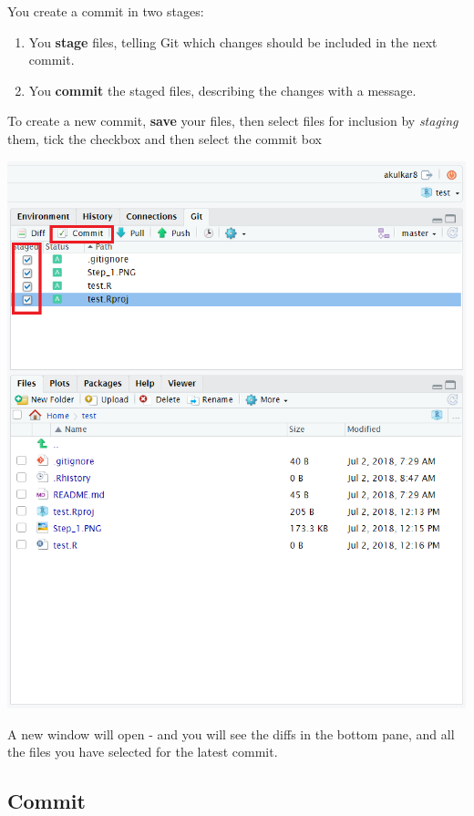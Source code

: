\documentclass[
]{book}
\begin{document}
You create a commit in two stages:

\begin{enumerate}
\def\labelenumi{\arabic{enumi}.}
\item
  You \textbf{stage} files, telling Git which changes should be included in the next commit.
\item
  You \textbf{commit} the staged files, describing the changes with a message.
\end{enumerate}

To create a new commit, \textbf{save} your files, then select files for inclusion by \emph{staging} them, tick the checkbox and then select the commit box

\includegraphics[width=11in]{images/stage_step_4}

A new window will open - and you will see the diffs in the bottom pane, and all the files you have selected for the latest commit.

\hypertarget{commit}{%
\subsection{Commit}\label{commit}}
\end{document}
